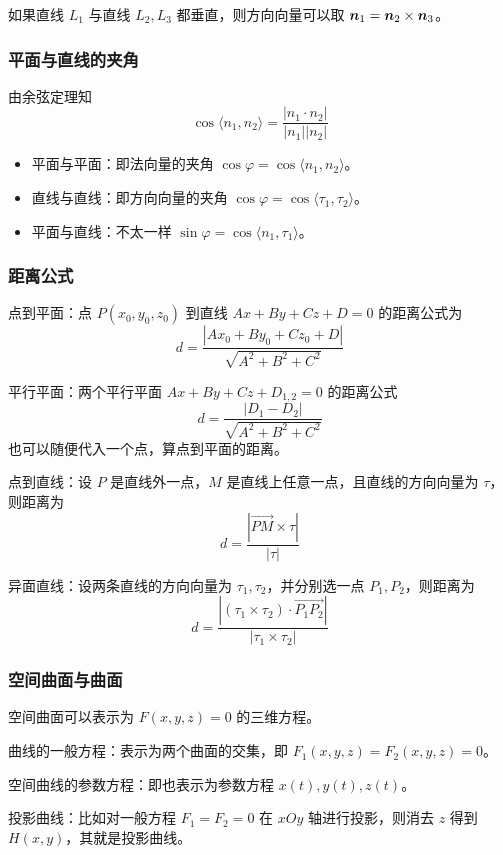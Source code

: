 如果直线 $L_1$ 与直线 $L_2, L_3$ 都垂直，则方向向量可以取 $\boldsymbol{n}_1 = \boldsymbol{n}_2 \times \boldsymbol{n}_3$。

\subsubsection*{平面与直线的夹角}

由余弦定理知
\[ \cos \langle n_1, n_2 \rangle = \frac{|n_1 \cdot n_2|}{|n_1| |n_2|} \]
\begin{itemize}
	\item 平面与平面：即法向量的夹角 $\cos \varphi = \cos\langle n_1, n_2 \rangle$。
	\item 直线与直线：即方向向量的夹角 $\cos \varphi = \cos\langle \tau_1, \tau_2 \rangle$。
	\item 平面与直线：不太一样 $\sin \varphi = \cos\langle n_1, \tau_1 \rangle$。
\end{itemize}

\subsubsection*{距离公式}

点到平面：点 $P(x_0, y_0, z_0)$ 到直线 $Ax+By+Cz+D =0$ 的距离公式为
\[ d = \frac{|Ax_0 + By_0 + Cz_0 + D|}{\sqrt{A^2 + B^2 + C^2}} \]

平行平面：两个平行平面 $Ax+By+Cz+D_{1,2} = 0$ 的距离公式
\[ d = \frac{|D_1 - D_2|}{\sqrt{A^2 + B^2 + C^2}} \]
也可以随便代入一个点，算点到平面的距离。

点到直线：设 $P$ 是直线外一点，$M$ 是直线上任意一点，且直线的方向向量为 $\tau$，则距离为
\[ d = \frac{|\overrightarrow{PM} \times \tau|}{|\tau|} \]

异面直线：设两条直线的方向向量为 $\tau_1, \tau_2$，并分别选一点 $P_1, P_2$，则距离为
\[ d = \frac{|(\tau_1 \times \tau_2) \cdot \overrightarrow{P_1P_2}|}{|\tau_1 \times \tau_2|} \]

\subsubsection*{空间曲面与曲面}

空间曲面可以表示为 $F(x, y, z) = 0$ 的三维方程。

曲线的一般方程：表示为两个曲面的交集，即 $F_1(x,y,z) = F_2(x, y,z) = 0$。

空间曲线的参数方程：即也表示为参数方程 $x(t), y(t), z(t)$。

投影曲线：比如对一般方程 $F_1 = F_2 = 0$ 在 $xOy$ 轴进行投影，则消去 $z$ 得到 $H(x, y)$，其就是投影曲线。

